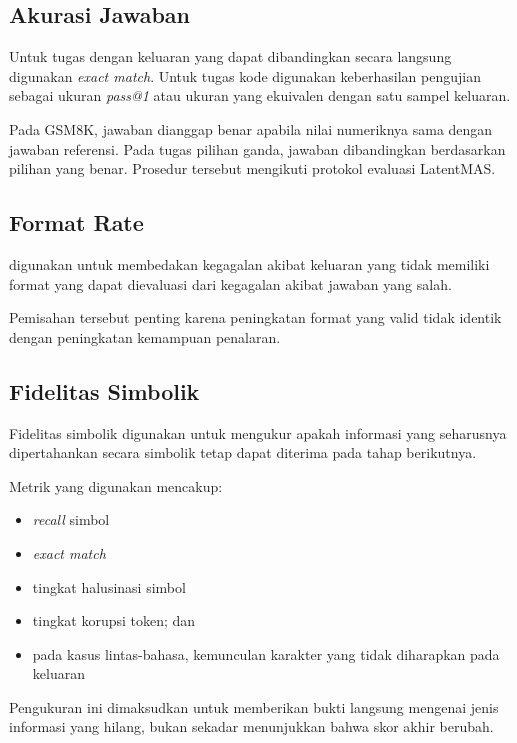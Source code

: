 \subsection{Akurasi Jawaban}

Untuk tugas dengan keluaran yang dapat dibandingkan secara langsung digunakan \textit{exact match}. Untuk tugas kode digunakan keberhasilan pengujian sebagai ukuran \textit{pass@1} atau ukuran yang ekuivalen dengan satu sampel keluaran.

Pada GSM8K, jawaban dianggap benar apabila nilai numeriknya sama dengan jawaban referensi. Pada tugas pilihan ganda, jawaban dibandingkan berdasarkan pilihan yang benar. Prosedur tersebut mengikuti protokol evaluasi LatentMAS.

\subsection{Format Rate}

 digunakan untuk membedakan kegagalan akibat keluaran yang tidak memiliki format yang dapat dievaluasi dari kegagalan akibat jawaban yang salah.

Pemisahan tersebut penting karena peningkatan format yang valid tidak identik dengan peningkatan kemampuan penalaran.

\subsection{Fidelitas Simbolik}

Fidelitas simbolik digunakan untuk mengukur apakah informasi yang seharusnya dipertahankan secara simbolik tetap dapat diterima pada tahap berikutnya.

Metrik yang digunakan mencakup:

\begin{itemize}
    \item \textit{recall} simbol
    \item \textit{exact match}
    \item tingkat halusinasi simbol
    \item tingkat korupsi token; dan
    \item pada kasus lintas-bahasa, kemunculan karakter yang tidak diharapkan pada keluaran
\end{itemize}

Pengukuran ini dimaksudkan untuk memberikan bukti langsung mengenai jenis informasi yang hilang, bukan sekadar menunjukkan bahwa skor akhir berubah.

